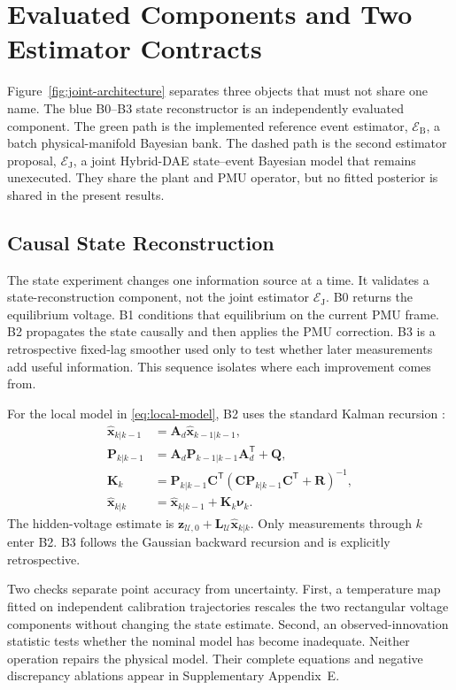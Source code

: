 \section{Evaluated Components and Two Estimator Contracts}
\label{sec:estimation}

Figure~\ref{fig:joint-architecture} separates three objects that must not share
one name. The blue B0--B3 state reconstructor is an independently evaluated
component. The green path is the implemented reference event estimator,
$\mathcal E_{\mathrm B}$, a batch physical-manifold Bayesian bank. The dashed
path is the second estimator proposal, $\mathcal E_{\mathrm J}$, a joint
Hybrid-DAE state--event Bayesian model that remains unexecuted. They share the
plant and PMU operator, but no fitted posterior is shared in the present results.

\subsection{Causal State Reconstruction}

The state experiment changes one information source at a time. It validates a
state-reconstruction component, not the joint estimator $\mathcal E_{\mathrm J}$.
B0 returns the equilibrium voltage. B1 conditions that equilibrium on the current PMU frame. B2 propagates the state causally and then applies the PMU correction. B3 is a retrospective fixed-lag smoother used only to test whether later measurements add useful information. This sequence isolates where each improvement comes from.

For the local model in \eqref{eq:local-model}, B2 uses the standard Kalman recursion \cite{kalman1960}:
\begin{align}
 \widehat{\bm x}_{k|k-1}&=\bm A_d\widehat{\bm x}_{k-1|k-1},
 \nonumber\\[-1mm]
 \bm P_{k|k-1}&=\bm A_d\bm P_{k-1|k-1}\bm A_d^{\mathsf T}+\bm Q,
 \nonumber\\
 \bm K_k&=\bm P_{k|k-1}\bm C^{\mathsf T}
 (\bm C\bm P_{k|k-1}\bm C^{\mathsf T}+\bm R)^{-1},
 \nonumber\\
 \widehat{\bm x}_{k|k}&=\widehat{\bm x}_{k|k-1}
 +\bm K_k\bm\nu_k. \label{eq:kf-compact}
\end{align}
The hidden-voltage estimate is $\bm z_{\mathcal U,0}+\bm L_{\mathcal U}\widehat{\bm x}_{k|k}$. Only measurements through $k$ enter B2. B3 follows the Gaussian backward recursion \cite{rauch1965smoothing} and is explicitly retrospective.

Two checks separate point accuracy from uncertainty. First, a temperature map fitted on independent calibration trajectories rescales the two rectangular voltage components without changing the state estimate. Second, an observed-innovation statistic tests whether the nominal model has become inadequate. Neither operation repairs the physical model. Their complete equations and negative discrepancy ablations appear in Supplementary Appendix~E.

